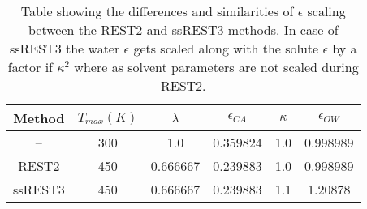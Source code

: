 \begin{table}[h!]
    \centering
    \caption{Table showing the differences and similarities of $\epsilon$ scaling between the REST2 and ssREST3 methods. In case of ssREST3 the 
    water $\epsilon$ gets scaled along with the solute $\epsilon$ by a factor if $\kappa^{2}$ where as solvent parameters are not scaled during REST2.}
    \begin{tabular}{c | c c c c c }

    Method & $T_{max}(K)$ & $\lambda$ & $\epsilon_{CA}$ & $\kappa$ & $\epsilon_{OW}$ \\
    \hline
    -- & 300 & 1.0 & 0.359824 & 1.0 & 0.998989 \\
    REST2 & 450 & 0.666667 & 0.239883 & 1.0 & 0.998989 \\

    ssREST3 & 450 & 0.666667 & 0.239883 & 1.1 & 1.20878 \\
    
    \hline
    \end{tabular}
    
    \label{tab:eps_table}
\end{table}
